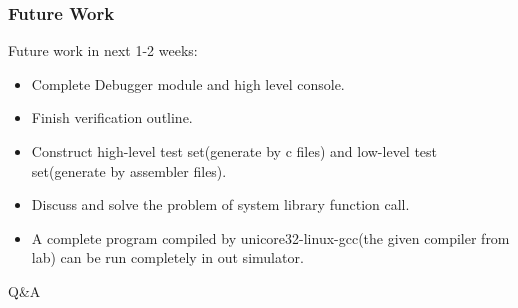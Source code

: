 \documentclass[CJK]{beamer}
\begin{document}
\begin{CJK}{UTF8}{gbsn}
\begin{frame}
  \frametitle{Future Work}
  Future work in next 1-2 weeks:
  \begin{itemize}
    \item Complete Debugger module and high level console.
    \item Finish verification outline.
    \item Construct high-level test set(generate by c files) and low-level test set(generate by assembler files).
    \item Discuss and solve the problem of system library function call.
    \item A complete program compiled by unicore32-linux-gcc(the given compiler from lab) can be run completely in out simulator.
  \end{itemize}
\end{frame}

\begin{frame}
  Q\&A
\end{frame}


\end{CJK}
\end{document}
